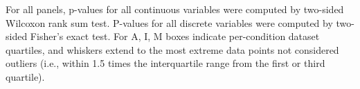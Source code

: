 For all panels, p-values for all continuous variables were computed by two-sided Wilcoxon rank sum test. 
P-values for all discrete variables were computed by two-sided Fisher’s exact test. 
For A, I, M boxes indicate per-condition dataset quartiles, and whiskers extend to the most extreme data points not considered outliers (i.e., within 1.5 times the interquartile range from the first or third quartile).